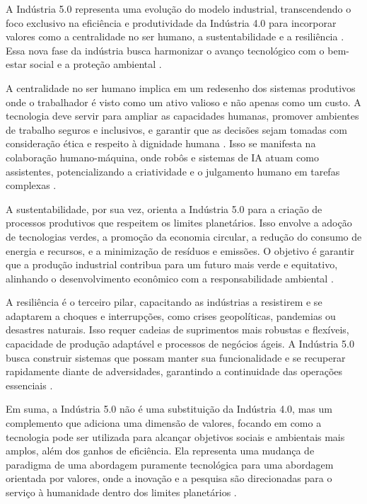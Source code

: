 A Indústria 5.0 representa uma evolução do modelo industrial, transcendendo o foco exclusivo na eficiência e produtividade da Indústria 4.0 para incorporar valores como a centralidade no ser humano, a sustentabilidade e a resiliência \cite{euCommission2021, Xu2021}.
Essa nova fase da indústria busca harmonizar o avanço tecnológico com o bem-estar social e a proteção ambiental \cite{Nahavandi2019}.

A centralidade no ser humano implica em um redesenho dos sistemas produtivos onde o trabalhador é visto como um ativo valioso e não apenas como um custo.
A tecnologia deve servir para ampliar as capacidades humanas, promover ambientes de trabalho seguros e inclusivos, e garantir que as decisões sejam tomadas com consideração ética e respeito à dignidade humana \cite{Nahavandi2019, TOTH2023}.
Isso se manifesta na colaboração humano-máquina, onde robôs e sistemas de IA atuam como assistentes, potencializando a criatividade e o julgamento humano em tarefas complexas \cite{VALETTE2023}.

A sustentabilidade, por sua vez, orienta a Indústria 5.0 para a criação de processos produtivos que respeitem os limites planetários.
Isso envolve a adoção de tecnologias verdes, a promoção da economia circular, a redução do consumo de energia e recursos, e a minimização de resíduos e emissões.
O objetivo é garantir que a produção industrial contribua para um futuro mais verde e equitativo, alinhando o desenvolvimento econômico com a responsabilidade ambiental \cite{euCommission2021, silva2024}.

A resiliência é o terceiro pilar, capacitando as indústrias a resistirem e se adaptarem a choques e interrupções, como crises geopolíticas, pandemias ou desastres naturais.
Isso requer cadeias de suprimentos mais robustas e flexíveis, capacidade de produção adaptável e processos de negócios ágeis.
A Indústria 5.0 busca construir sistemas que possam manter sua funcionalidade e se recuperar rapidamente diante de adversidades, garantindo a continuidade das operações essenciais \cite{euCommission2021, Khan2023}.

Em suma, a Indústria 5.0 não é uma substituição da Indústria 4.0, mas um complemento que adiciona uma dimensão de valores, focando em como a tecnologia pode ser utilizada para alcançar objetivos sociais e ambientais mais amplos, além dos ganhos de eficiência.
Ela representa uma mudança de paradigma de uma abordagem puramente tecnológica para uma abordagem orientada por valores, onde a inovação e a pesquisa são direcionadas para o serviço à humanidade dentro dos limites planetários \cite{Xu2021, VALETTE2023}.

